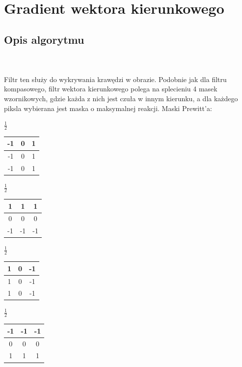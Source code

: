 \documentclass[final,a4paper,openany,12pt]{mwbk}
\begin{document}
\newpage

\section{Gradient wektora kierunkowego}
\subsection*{Opis algorytmu}
\hfill
\\\\
\indent Filtr ten służy do wykrywania krawędzi w obrazie. Podobnie jak dla filtru kompasowego, filtr wektora kierunkowego polega na splecieniu 4 masek wzornikowych, gdzie każda z nich jest czuła w innym kierunku, a dla każdego piksla wybierana jest maska o maksymalnej reakcji. Maski Prewitt'a:

\begin{center}
	$\frac{1}{2}$
	\begin{tabular}{|c|c|c|}
		\hline
		-1 & 0 & 1\\
		\hline
		-1 & 0 & 1\\
		\hline
		-1 & 0 & 1\\
		\hline	
	\end{tabular}
\end{center}

\begin{center}
	$\frac{1}{2}$
	\begin{tabular}{|c|c|c|}
		\hline
		1 & 1 & 1\\
		\hline
		0 & 0 & 0\\
		\hline
		-1 & -1 & -1\\
		\hline
	\end{tabular}
\end{center}

\begin{center}
	$\frac{1}{2}$
	\begin{tabular}{|c|c|c|}
		\hline
		1 & 0 & -1\\
		\hline
		1 & 0 & -1\\
		\hline
		1 & 0 & -1\\
		\hline
	\end{tabular}
\end{center}

\begin{center}
	$\frac{1}{2}$
	\begin{tabular}{|c|c|c|}
		\hline
		-1 & -1 & -1\\
		\hline
		0 & 0 & 0\\
		\hline
		1 & 1 & 1\\
		\hline
	\end{tabular}
\end{center}
\end{document}
